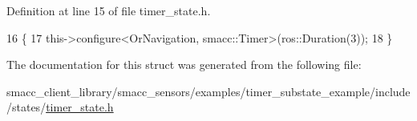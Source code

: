 Definition at line 15 of file timer\+\_\+state.\+h.


\begin{DoxyCode}
16   \{
17     this->configure<OrNavigation, smacc::Timer>(ros::Duration(3));
18   \}
\end{DoxyCode}


The documentation for this struct was generated from the following file\+:\begin{DoxyCompactItemize}
\item 
smacc\+\_\+client\+\_\+library/smacc\+\_\+sensors/examples/timer\+\_\+substate\+\_\+example/include/states/\hyperlink{timer__state_8h}{timer\+\_\+state.\+h}\end{DoxyCompactItemize}
